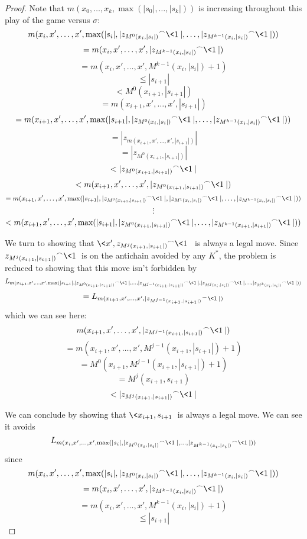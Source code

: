 \begin{proof}
Note that $m(x_0,\dots,x_{k},\max(|s_0|,\dots,|s_k|))$ is increasing throughout this play of the game versus $\sigma$:
  \[
    m(x_i,x',\dots,x',\max(|s_i|,|{z_{M^0(x_i,|s_i|)}}^\frown\<1\>|,\dots,|{z_{M^{k-1}(x_i,|s_i|)}}^\frown\<1\>|))
  \]
  \[
    =
    m(x_i,x',\dots,x',|{z_{M^{k-1}(x_i,|s_i|)}}^\frown\<1\>|)
  \]
  \[
    =
    m(x_i,x',\dots,x',M^{k-1}(x_i,|s_i|)+1)
  \]
  \[
    \leq
    |s_{i+1}|
  \]
  \[
    <
    M^0(x_{i+1},|s_{i+1}|)
  \]
  \[
    =
    m(x_{i+1},x',\dots,x',|s_{i+1}|)
  \]
  \[
    =
    m(x_{i+1},x',\dots,x',\max(|s_{i+1}|,|{z_{M^0(x_i,|s_i|)}}^\frown\<1\>|,\dots,|{z_{M^{k-1}(x_i,|s_i|)}}^\frown\<1\>|))
  \]
  \[
    =
    |{z_{m(x_{i+1},x',\dots,x',|s_{i+1}|)}}|
  \]
  \[
    =
    |{z_{M^0(x_{i+1},|s_{i+1}|)}}|
  \]
  \[
    <
    |{z_{M^0(x_{i+1},|s_{i+1}|)}}^\frown\<1\>|
  \]
  \[
    <
    m(x_{i+1},x',\dots,x',|{z_{M^0(x_{i+1},|s_{i+1}|)}}^\frown\<1\>|)
  \]
  \[
    =
    m(x_{i+1},x',\dots,x',\max(|s_{i+1}|,|{z_{M^0(x_{i+1},|s_{i+1}|)}}^\frown\<1\>|,|{z_{M^1(x_{i},|s_{i}|)}}^\frown\<1\>|,\dots,|{z_{M^{k-1}(x_{i},|s_{i}|)}}^\frown\<1\>|))
  \]
  \[
    \vdots
  \]
  \[
    <
    m(x_{i+1},x',\dots,x',\max(|s_{i+1}|,|{z_{M^0(x_{i+1},|s_{i+1}|)}}^\frown\<1\>|,\dots,|{z_{M^{k-1}(x_{i+1},|s_{i+1}|)}}^\frown\<1\>|))
  \]

We turn to showing that $\<x', {z_{M^j(x_{i+1},|s_{i+1}|)}}^\frown\<1\>\>$ is always a legal move. Since ${z_{M^j(x_{i+1},|s_{i+1}|)}}^\frown\<1\>$ is on the antichain avoided by any $K^*$, the problem is reduced to showing that this move isn't forbidden by
  \[
    L_{m(x_{i+1},x',\dots,x',\max(|s_{i+1}|,|{z_{M^0(x_{i+1},|s_{i+1}|)}}^\frown\<1\>|,\dots,|{z_{M^{j-1}(x_{i+1},|s_{i+1}|)}}^\frown\<1\>|,|{z_{M^{j}(x_{i},|s_{i}|)}}^\frown\<1\>|,\dots,|{z_{M^{k}(x_{i},|s_{i}|)}}^\frown\<1\>|))}
  \]
  \[
    =
    L_{m(x_{i+1},x',\dots,x',|{z_{M^{j-1}(x_{i+1},|s_{i+1}|)}}^\frown\<1\>|)}
  \]
which we can see here:
  \[
    m(x_{i+1},x',\dots,x',|{z_{M^{j-1}(x_{i+1},|s_{i+1}|)}}^\frown\<1\>|)
  \]
  \[
    =
    m(x_{i+1},x',\dots,x',M^{j-1}(x_{i+1},|s_{i+1}|)+1)
  \]
  \[
    =
    M^0(x_{i+1},M^{j-1}(x_{i+1},|s_{i+1}|)+1)
  \]
  \[
    =
    M^j(x_{i+1},s_{i+1})
  \]
  \[
    <
    |{z_{M^j(x_{i+1},|s_{i+1}|)}}^\frown\<1\>|
  \]

We can conclude by showing that $\<x_{i+1},s_{i+1}\>$ is always a legal move. We can see it avoids
  \[
  L_{m(x_{i},x',\dots,x',\max(|s_{i}|,|{z_{M^0(x_i,|s_i|)}}^\frown\<1\>|,\dots,|{z_{M^{k-1}(x_i,|s_i|)}}^\frown\<1\>|))}
  \]
since
  \[
    m(x_{i},x',\dots,x',\max(|s_{i}|,|{z_{M^0(x_i,|s_i|)}}^\frown\<1\>|,\dots,|{z_{M^{k-1}(x_i,|s_i|)}}^\frown\<1\>|))
  \]
  \[
    =
    m(x_{i},x',\dots,x',|{z_{M^{k-1}(x_i,|s_i|)}}^\frown\<1\>|)
  \]
  \[
    =
    m(x_{i},x',\dots,x',M^{k-1}(x_i,|s_i|)+1)
  \]
  \[
    \leq
    |s_{i+1}|
  \]




\end{proof}
